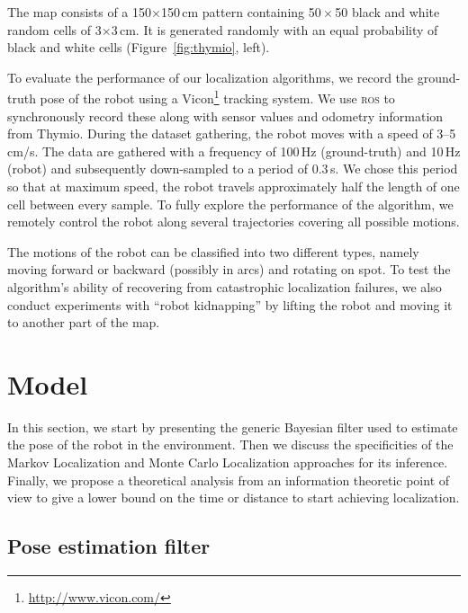 \documentclass[letterpaper, 10pt, conference]{ieeeconf}
\newcommand{\fig}[1]{Figure~\ref{fig:#1}}
\begin{document}
The map consists of a 150$\times$150\,cm pattern containing 50\,$\times$\,50 black and white random cells of 3$\times$3\,cm.
It is generated randomly with an equal probability of black and white cells (\fig{thymio}, left).

To evaluate the performance of our localization algorithms, we record the ground-truth pose of the robot using a Vicon\footnote{\url{http://www.vicon.com/}} tracking system.
We use \textsc{ros} to synchronously record these along with sensor values and odometry information from Thymio.
During the dataset gathering, the robot moves with a speed of 3--5\,cm/s.
The data are gathered with a frequency of 100\,Hz (ground-truth) and 10\,Hz (robot) and subsequently down-sampled to a period of 0.3\,s.
We chose this period so that at maximum speed, the robot travels approximately half the length of one cell between every sample.
To fully explore the performance of the algorithm, we remotely control the robot along several trajectories covering all possible motions.

The motions of the robot can be classified into two different types, namely moving forward or backward (possibly in arcs) and rotating on spot.
To test the algorithm's ability of recovering from catastrophic localization failures, we also conduct experiments with ``robot kidnapping'' by lifting the robot and moving it to another part of the map.

\section{Model}


In this section, we start by presenting the generic Bayesian filter used to estimate the pose of the robot in the environment.
Then we discuss the specificities of the Markov Localization and Monte Carlo Localization approaches for its inference.
Finally, we propose a theoretical analysis from an information theoretic point of view to give a lower bound on the time or distance to start achieving localization.

\subsection{Pose estimation filter}
\end{document}
